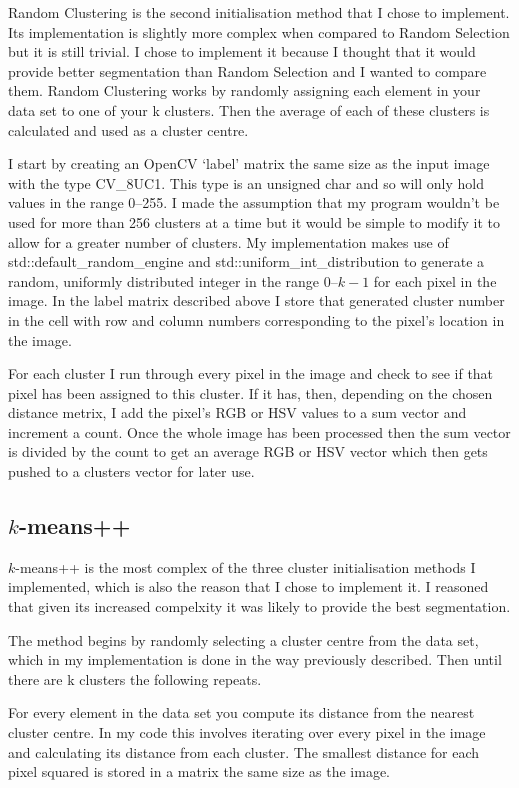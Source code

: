 \documentclass{article}
\begin{document}
Random Clustering is the second initialisation method that I chose to implement. Its implementation is slightly more complex when compared to Random Selection but it is still trivial. I chose to implement it because I thought that it would provide better segmentation than Random Selection and I wanted to compare them. Random Clustering works by randomly assigning each element in your data set to one of your k clusters. Then the average of each of these clusters is calculated and used as a cluster centre. 

I start by creating an OpenCV `label' matrix the same size as the input image with the type CV\_8UC1. This type is an unsigned char and so will only hold values in the range 0--255. I made the assumption that my program wouldn't be used for more than 256 clusters at a time but it would be simple to modify it to allow for a greater number of clusters.  My implementation makes use of std::default\_random\_engine and std::uniform\_int\_distribution to generate a random, uniformly distributed integer in the range 0--$k-1$ for each pixel in the image. In the label matrix described above I store that generated cluster number in the cell with row and column numbers corresponding to the pixel's location in the image.

For each cluster I run through every pixel in the image and check to see if that pixel has been assigned to this cluster. If it has, then, depending on the chosen distance metrix, I add the pixel's RGB or HSV values to a sum vector and increment a count. Once the whole image has been processed then the sum vector is divided by the count to get an average RGB or HSV vector which then gets pushed to a clusters vector for later use.

\subsection{$k$-means++}

$k$-means++ is the most complex of the three cluster initialisation methods I implemented, which is also the reason that I chose to implement it. I reasoned that given its increased compelxity it was likely to provide the best segmentation.  

The method begins by randomly selecting a cluster centre from the data set, which in my implementation is done in the way previously described. Then until there are k clusters the following repeats. 

For every element in the data set you compute its distance from the nearest cluster centre. In my code this involves iterating over every pixel in the image and calculating its distance from each cluster. The smallest distance for each pixel squared is stored in a matrix the same size as the image.
\end{document}
